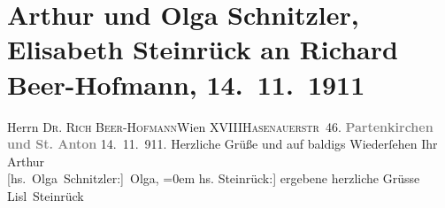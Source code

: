 

         
         \renewcommand{\erwaehntePersonen}{Personen: Richard Beer-Hofmann}
         \renewcommand{\erwaehnteOrte}{Orte: Garmisch-Partenkirchen, Hasenauerstraße, Partenkirchen, St. Anton, Wien, XVIII., Währing}
         \renewcommand{\erwaehnteWerke}{}
               \section[Arthur und Olga Schnitzler, Elisabeth Steinrück an Richard Beer-Hofmann, 14. 11. 1911]{ Arthur und Olga Schnitzler, Elisabeth Steinrück an Richard
               Beer-Hofmann, 14. 11. 1911}\nopagebreak{}\rehead{ }\begin{ledgroupsized}[t]{13cm}\normalsize\beginnumbering \toendnotes[C]{\smallbreak\pagebreak[2]} 
\pstart{}{\pb}Herrn \textsc{Dr. Rich
                     Beer-Hofmann}\pend{}\pstart{}Wien XVIII\pend{}\pstart{}\textsc{Hasenauerstr 46.}\pend{}{\bigskip}\pstart
           \noindent{}\centering{}{\pb}\textcolor{gray}{\textbf{Partenkirchen und St. Anton}}\pend
           \pstart
           {\pb}14. 11. 911.\pend
           \pstart
           Herzliche Grüße und auf baldigs Wiederſehen\pend
           \pstart
           Ihr \spacefill\mbox{Arthur}{\\[\baselineskip]}\spacefill\mbox{{[}hs. Olga Schnitzler:{]} Olga,}\pend
           \leftskip=0em{}\pstart
           \noindent{}{[}hs. Steinrück:{]} ergebene herzliche Grüsse\pend
           \pstart \spacefill\mbox{Lisl Steinrück}\pend{}
         
         \endnumbering{}\end{ledgroupsized}  \newcommand{\dateiname}{L02045}\newcommand{\titel}{Arthur und Olga Schnitzler, Elisabeth Steinrück an Richard Beer-Hofmann, 14. 11. 1911}\newcommand{\editorInnen}{Martin Anton Müller und Gerd-Hermann Susen}
      